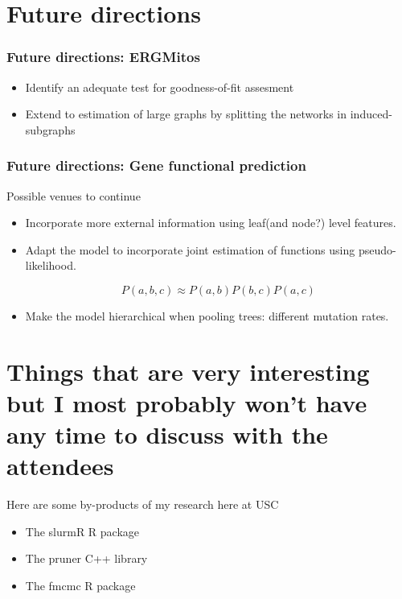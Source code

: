 \documentclass{beamer}
\begin{document}
\section{Future directions}
\begin{frame}
\frametitle{Future directions: ERGMitos}

\begin{itemize}
\item Identify an adequate test for goodness-of-fit assesment
\item Extend to estimation of large graphs by splitting the networks in induced-subgraphs
\end{itemize}

\end{frame}

\begin{frame}
\frametitle{Future directions: Gene functional prediction}

Possible venues to continue

\begin{itemize}
\item Incorporate more external information using leaf(and node?) level features.
\item Adapt the model to incorporate joint estimation of functions using pseudo-likelihood.

$$
P(a, b, c) \approx P(a,b)P(b,c)P(a,c)
$$
\item Make the model hierarchical when pooling trees: different mutation rates.
\end{itemize}

\end{frame}


\section{Things that are very interesting but I most probably won't have any time to discuss with the attendees}

\begin{frame}
Here are some by-products of my research here at USC

\begin{itemize}
\item The slurmR R package
\item The pruner C++ library
\item The fmcmc R package
\end{itemize}

\end{frame}
\end{document}
